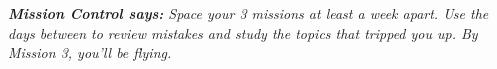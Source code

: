 {\vspace{3mm}

\begin{tcolorbox}[
    enhanced,
    colback=funBlueDark!4,
    colframe=funBlueDark!25,
    arc=12pt, boxrule=0.8pt,
    left=5mm, right=5mm, top=3mm, bottom=3mm,
]
    \begin{minipage}[c]{0.07\linewidth}
        \centering \iconOwl[1.1cm]
    \end{minipage}%
    \hfill
    \begin{minipage}[c]{0.90\linewidth}
        \small\itshape\color{funBlueDark}
        \textbf{Mission Control says:} Space your 3 missions at least a week apart.
        Use the days between to review mistakes and study the topics that
        tripped you up. By Mission 3, you'll be flying.
    \end{minipage}
\end{tcolorbox}

}

\newpage
